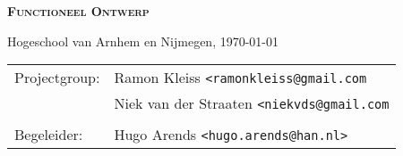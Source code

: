 \begin{titlepage}

\Huge \textsc{\bfseries Functioneel Ontwerp} \normalsize

\vfill

\begin{minipage}[b][1em][b]{\linewidth}
\end{minipage}

\begin{minipage}[b][1em][b]{\linewidth}
    Hogeschool van Arnhem en Nijmegen, \today
\end{minipage}

\begin{minipage}[b][2em][b]{\linewidth}
\end{minipage}

\begin{minipage}[b][2em][b]{\linewidth}
\end{minipage}

\begin{minipage}[b][4em][b]{\linewidth}
    \begin{tabular}{l l }
        Projectgroup:   & Ramon Kleiss \texttt{<ramonkleiss@gmail.com} \\
                        & Niek van der Straaten \texttt{<niekvds@gmail.com} \\
                        \\
        Begeleider:     & Hugo Arends \texttt{<hugo.arends@han.nl>} \\
    \end{tabular}
\end{minipage}

\end{titlepage}
